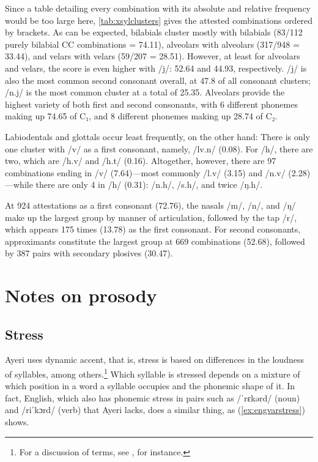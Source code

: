Since a table detailing every combination with its absolute and relative
frequency would be too large here, \autoref{tab:xsylclusters} gives the
attested combinations ordered by brackets. As can be expected, bilabials
cluster mostly with bilabials (83/112 purely bilabial CC combinations =
74.11\pct), alveolars with alveolars (317/948 = 33.44\pct), and velars with
velars (59/207 = 28.51\pct). However, at least for alveolars and velars, the
score is even higher with /j/: 52.64\pct{} and 44.93\pct{}, respectively. /j/
is also the most common second consonant overall, at 47.8\pct{} of all
consonant clusters; /n.j/ is the most common cluster at a total of 25.35\pct{}.
Alveolars provide the highest variety of both first and second consonants, with
6 different phonemes making up 74.65\pct{} of C₁, and 8 different phonemes
making up 28.74\pct{} of C₂.

Labiodentals and glottals occur least frequently, on the other hand: There is
only one cluster with /v/ as a first consonant, namely, /lv.n/ (0.08\pct). For
/h/, there are two, which are /h.v/ and /h.t/ (0.16\pct). Altogether, however,
there are 97 combinations ending in /v/ (7.64\pct)---most commonly /l.v/
(3.15\pct) and /n.v/ (2.28\pct)---while there are only 4 in /h/ (0.31\pct):
/n.h/, /s.h/, and twice /ŋ.h/.

At 924 attestations as a first consonant (72.76\pct), the nasals /m/, /n/, and
/ŋ/ make up the largest group by manner of articulation, followed by the tap
/r/, which appears 175 times (13.78\pct) as the first consonant. For second
consonants, approximants constitute the largest group at 669 combinations
(52.68\pct), followed by 387 pairs with secondary plosives (30.47\pct).
%

\section{Notes on prosody}

\subsection{Stress}

Ayeri uses dynamic accent, that is, stress is based on differences in the 
loudness of syllables, among others.\footnote{For a discussion of terms, see 
\citet{kager2007}, for instance.} Which syllable is stressed depends on a 
mixture of which position in a word a syllable occupies and the phonemic shape 
of it. In fact, English, which also has phonemic stress in pairs such as 
 /ˈrɛkərd/ (noun) and /riˈkɔrd/ (verb) that Ayeri lacks, does a 
similar thing, as (\ref{ex:engvarstress}) shows.

